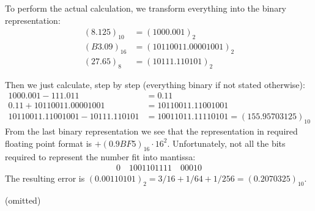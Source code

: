 \documentclass[10pt,a4paper]{scrartcl}
\newcommand{\subExercise}[1]{\vspace{0.5em} \noindent{\bf #1)}}
\begin{document}
\subExercise{a}
To perform the actual calculation, we transform everything into the binary representation:
\begin{align*}
(8.125)_{10} &= (1000.001)_2 \\
(B3.09)_{16} &= (10110011.00001001)_2 \\
(27.65)_8 &= (10111.110101)_2
\end{align*}

Then we just calculate, step by step (everything binary if not stated otherwise):
\begin{align*}
1000.001 - 111.011 &= 0.11 \\
0.11 + 10110011.00001001 &= 10110011.11001001 \\
10110011.11001001 - 10111.110101 &= 10011011.11110101 = (155.95703125)_{10}
\end{align*}
From the last binary representation we see that the representation in required floating point format is
$+(0.9BF5)_{16}\cdot16^2$. Unfortunately, not all the bits required to represent the number fit into mantissa:
\begin{align*}
0 \quad 1001101111 \quad 00010
\end{align*}
The resulting error is $(0.00110101)_2 = 3/16 + 1/64 + 1/256 = (0.2070325)_{10}$.

\subExercise{b} (omitted)
\end{document}
